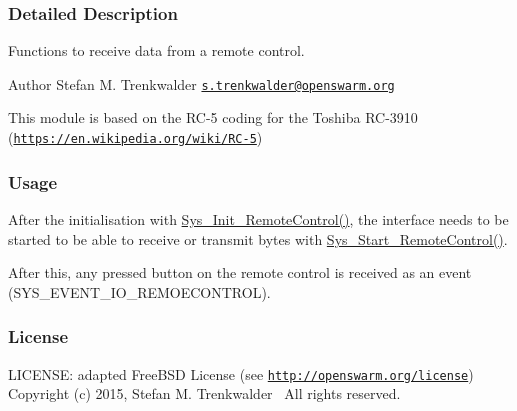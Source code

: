 \subsubsection{Detailed Description}
Functions to receive data from a remote control. 

\begin{DoxyAuthor}{Author}
Stefan M. Trenkwalder \href{mailto:s.trenkwalder@openswarm.org}{\tt s.\+trenkwalder@openswarm.\+org}
\end{DoxyAuthor}
This module is based on the R\+C-\/5 coding for the Toshiba R\+C-\/3910 (\href{https://en.wikipedia.org/wiki/RC-5}{\tt https\+://en.\+wikipedia.\+org/wiki/\+R\+C-\/5})\hypertarget{group__remotecontrol_rc_usage}{}\subsubsection{Usage}\label{group__remotecontrol_rc_usage}
After the initialisation with \hyperlink{remoteControl_8h_a3265e493859892f6ebca8df6252d6f8e}{Sys\+\_\+\+Init\+\_\+\+Remote\+Control()}, the interface needs to be started to be able to receive or transmit bytes with \hyperlink{remoteControl_8h_a5aaecc26aad6d1c545a225b1ce92cec7}{Sys\+\_\+\+Start\+\_\+\+Remote\+Control()}.

After this, any pressed button on the remote control is received as an event (S\+Y\+S\+\_\+\+E\+V\+E\+N\+T\+\_\+\+I\+O\+\_\+\+R\+E\+M\+O\+E\+C\+O\+N\+T\+R\+O\+L).\hypertarget{group__remotecontrol_rc_license}{}\subsubsection{License}\label{group__remotecontrol_rc_license}
L\+I\+C\+E\+N\+S\+E\+: adapted Free\+B\+S\+D License (see \href{http://openswarm.org/license}{\tt http\+://openswarm.\+org/license})~\newline
Copyright (c) 2015, Stefan M. Trenkwalder~\newline
All rights reserved. 